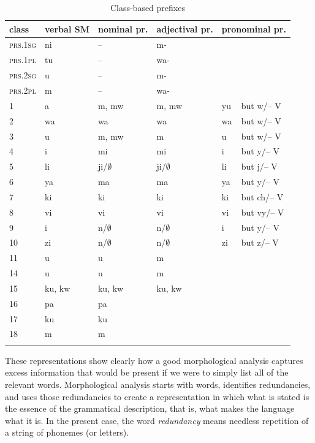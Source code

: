 \documentclass[output=paper,colorlinks,citecolor=brown]{langscibook}
\begin{document}
\begin{table}
\begin{tabular}{*6{l}}\lsptoprule
class & verbal SM & nominal pr. & adjectival pr.  & \multicolumn{2}{l}{pronominal pr.} \\\midrule
\textsc{prs.1sg} & ni &  --  & m- \\
\textsc{prs.1pl} & tu & --  & wa- \\
\textsc{prs.2sg} & u & --  &m-  \\
\textsc{prs.2pl} & m & -- & wa- \\
1 & a & m, mw  & m, mw & yu & but w\slash -- V \\
2 & wa & wa & wa & wa & but w\slash -- V\\
3 & u & m, mw & m & u&  but w\slash -- V \\
4 & i & mi & mi & i& but y\slash -- V  \\
5 & li & ji/$\emptyset$ & ji/$\emptyset$ & li & but j\slash -- V  \\
6 & ya & ma & ma & ya & but y\slash -- V  \\
7 & ki &ki & ki & ki & but ch\slash -- V \\
8 & vi & vi & vi & vi & but vy\slash -- V  \\
9 & i & n/$\emptyset$ & n/$\emptyset$  & i & but y\slash -- V  \\
10 & zi & n/$\emptyset$ & n/$\emptyset$  & zi & but z\slash -- V    \\
11 & u & u  & m  \\
14 & u & u & m \\
15 & ku, kw & ku, kw  & ku, kw\\ 
16 & pa & pa\\
17 & ku & ku \\
18 & m & m \\
\lspbottomrule
\end{tabular}
\caption{Class-based prefixes\label{class-based-system}}
\end{table}
 
  
These representations show clearly how a good morphological analysis captures excess information that would be present if we were to simply list all of the relevant words. Morphological analysis starts with words, identifies redundancies, and uses those redundancies to create a representation in which what is stated is the essence of the grammatical description, that is, what makes the language what it is. In the present case, the word \textit{redundancy} means needless repetition of a string of phonemes (or letters).
\end{document}
